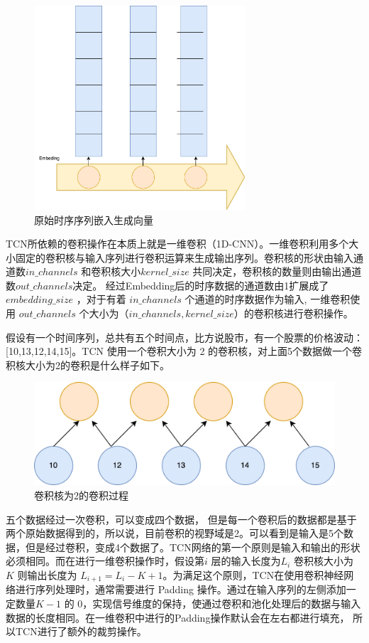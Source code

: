 \begin{figure}[htbp]
	\centering
	\includegraphics[width=0.7\textwidth]{figures/embedding.png}
	\caption{原始时序序列嵌入生成向量}
\end{figure}

TCN所依赖的卷积操作在本质上就是一维卷积（1D-CNN）。一维卷积利用多个大小固定的卷积核与输入序列进行卷积运算来生成输出序列。卷积核的形状由输入通道数$in\_channels$ 和卷积核大小$kernel\_size$ 共同决定，卷积核的数量则由输出通道数$out\_channels$决定。
经过Embedding后的时序数据的通道数由1扩展成了$embedding\_size$ ，对于有着 $in\_channels$ 个通道的时序数据作为输入, 一维卷积使用 $out\_channels$ 个大小为（$in\_channels, kernel\_size$）的卷积核进行卷积操作。

假设有一个时间序列，总共有五个时间点，比方说股市，有一个股票的价格波动：[10,13,12,14,15]。TCN 使用一个卷积大小为 2 的卷积核，对上面5个数据做一个卷积核大小为2的卷积是什么样子如下。

\begin{figure}[htbp]
	\centering
	\includegraphics[width=.9\textwidth]{figures/convolution_1.png}
	\caption{卷积核为2的卷积过程}
\end{figure}

五个数据经过一次卷积，可以变成四个数据，
但是每一个卷积后的数据都是基于两个原始数据得到的，所以说，目前卷积的视野域是2。可以看到是输入是5个数据，但是经过卷积，变成4个数据了。TCN网络的第一个原则是输入和输出的形状必须相同。而在进行一维卷积操作时，假设第$i$ 层的输入长度为$L_i$ 卷积核大小为 $K$ 则输出长度为 $L_{i+1} = L_{i} - K + 1$。为满足这个原则，TCN在使用卷积神经网络进行序列处理时，通常需要进行 Padding 操作。通过在输入序列的左侧添加一定数量$K-1$ 的 0，实现信号维度的保持，使通过卷积和池化处理后的数据与输入数据的长度相同。在一维卷积中进行的Padding操作默认会在左右都进行填充，
所以TCN进行了额外的裁剪操作。


